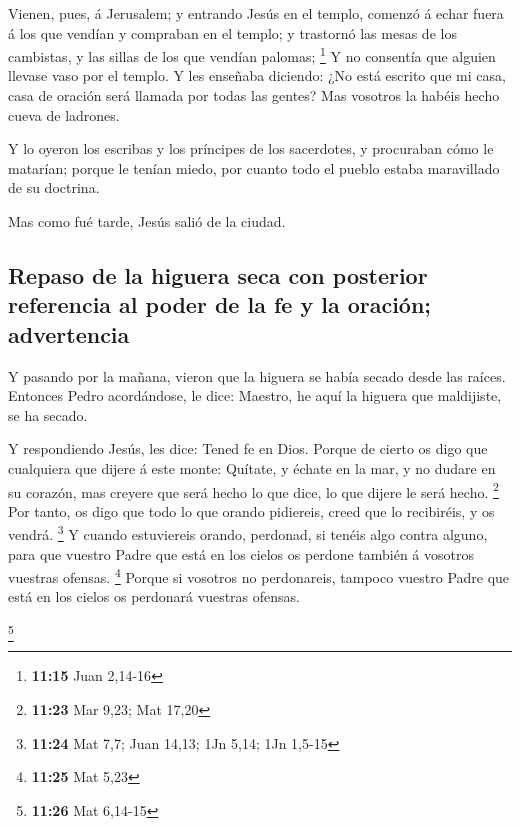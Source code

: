  Vienen, pues, á Jerusalem; y entrando Jesús en el
templo, comenzó á echar fuera á los que vendían y compraban en el
templo; y trastornó las mesas de los cambistas, y las sillas de los que
vendían palomas; \footnote{\textbf{11:15} Juan 2,14-16} 
Y no consentía que alguien llevase vaso por el templo.  Y
les enseñaba diciendo: ¿No está escrito que mi casa, casa de oración
será llamada por todas las gentes? Mas vosotros la habéis hecho cueva de
ladrones.

 Y lo oyeron los escribas y los príncipes de los
sacerdotes, y procuraban cómo le matarían; porque le tenían miedo, por
cuanto todo el pueblo estaba maravillado de su doctrina.

 Mas como fué tarde, Jesús salió de la ciudad.

\hypertarget{repaso-de-la-higuera-seca-con-posterior-referencia-al-poder-de-la-fe-y-la-oraciuxf3n-advertencia}{%
\subsection{Repaso de la higuera seca con posterior referencia al poder
de la fe y la oración;
advertencia}\label{repaso-de-la-higuera-seca-con-posterior-referencia-al-poder-de-la-fe-y-la-oraciuxf3n-advertencia}}

 Y pasando por la mañana, vieron que la higuera se había
secado desde las raíces.  Entonces Pedro acordándose, le
dice: Maestro, he aquí la higuera que maldijiste, se ha secado.

 Y respondiendo Jesús, les dice: Tened fe en Dios.
 Porque de cierto os digo que cualquiera que dijere á
este monte: Quítate, y échate en la mar, y no dudare en su corazón, mas
creyere que será hecho lo que dice, lo que dijere le será hecho.
\footnote{\textbf{11:23} Mar 9,23; Mat 17,20}  Por tanto,
os digo que todo lo que orando pidiereis, creed que lo recibiréis, y os
vendrá. \footnote{\textbf{11:24} Mat 7,7; Juan 14,13; 1Jn 5,14; 1Jn
  1,5-15}  Y cuando estuviereis orando, perdonad, si
tenéis algo contra alguno, para que vuestro Padre que está en los cielos
os perdone también á vosotros vuestras ofensas. \footnote{\textbf{11:25}
  Mat 5,23}  Porque si vosotros no perdonareis, tampoco
vuestro Padre que está en los cielos os perdonará vuestras ofensas.

\footnote{\textbf{11:26} Mat 6,14-15}

